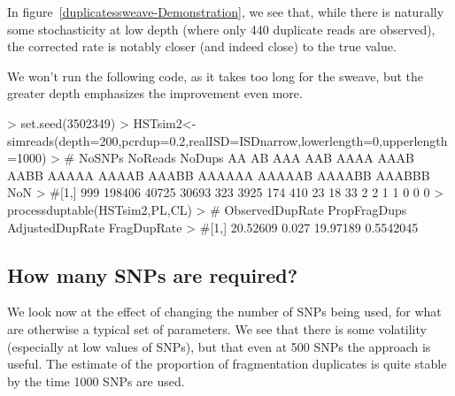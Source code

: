 \documentclass{article}
\begin{document}

In figure~\ref{duplicatessweave-Demonstration}, we see that, while there is naturally some stochasticity at low depth (where only 440 duplicate reads are observed), the corrected rate is notably closer (and indeed close) to the true value.

We won't run the following code, as it takes too long for the sweave, but the greater depth emphasizes the improvement even more.

\begin{Schunk}
\begin{Sinput}
> set.seed(3502349)
> HSTsim2<-simreads(depth=200,pcrdup=0.2,realISD=ISDnarrow,lowerlength=0,upperlength=1000)
> #     NoSNPs NoReads NoDups    AA  AB  AAA AAB AAAA AAAB AABB AAAAA AAAAB AAABB AAAAAA AAAAAB AAAABB AAABBB NoN
> #[1,]    999  198406  40725 30693 323 3925 174  410   23   18    33     2     2      1      1      0      0   0
> processduptable(HSTsim2,PL,CL)
> #     ObservedDupRate PropFragDups AdjustedDupRate FragDupRate
> #[1,]        20.52609        0.027        19.97189   0.5542045
\end{Sinput}
\end{Schunk}

\subsection{How many SNPs are required?}

We look now at the effect of changing the number of SNPs being used, for what are otherwise a typical set of parameters. We see that there is some volatility (especially at low values of SNPs), but that even at 500 SNPs the approach is useful. The estimate of the proportion of fragmentation duplicates is quite stable by the time 1000 SNPs are used.
\end{document}

